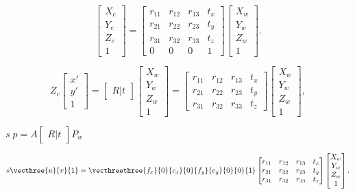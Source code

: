 \documentclass{article}
\begin{document}
\[\begin{bmatrix}
X_c \\
Y_c \\
Z_c \\
1
\end{bmatrix} = \begin{bmatrix}
r_{11} & r_{12} & r_{13} & t_x \\
r_{21} & r_{22} & r_{23} & t_y \\
r_{31} & r_{32} & r_{33} & t_z \\
0 & 0 & 0 & 1
\end{bmatrix}
\begin{bmatrix}
X_w \\
Y_w \\
Z_w \\
1
\end{bmatrix}.\]
\pagebreak

\[Z_c \begin{bmatrix}
x' \\
y' \\
1
\end{bmatrix} = \begin{bmatrix} R|t \end{bmatrix} \begin{bmatrix}
X_w \\
Y_w \\
Z_w \\
1
\end{bmatrix} = \begin{bmatrix}
r_{11} & r_{12} & r_{13} & t_x \\
r_{21} & r_{22} & r_{23} & t_y \\
r_{31} & r_{32} & r_{33} & t_z
\end{bmatrix}
\begin{bmatrix}
X_w \\
Y_w \\
Z_w \\
1
\end{bmatrix},\]
\pagebreak

$s \; p = A \begin{bmatrix} R|t \end{bmatrix} P_w$
\pagebreak

\[s \vecthree{u}{v}{1} = \vecthreethree{f_x}{0}{c_x}{0}{f_y}{c_y}{0}{0}{1}
\begin{bmatrix}
r_{11} & r_{12} & r_{13} & t_x \\
r_{21} & r_{22} & r_{23} & t_y \\
r_{31} & r_{32} & r_{33} & t_z
\end{bmatrix}
\begin{bmatrix}
X_w \\
Y_w \\
Z_w \\
1
\end{bmatrix}.\]
\pagebreak
\end{document}

